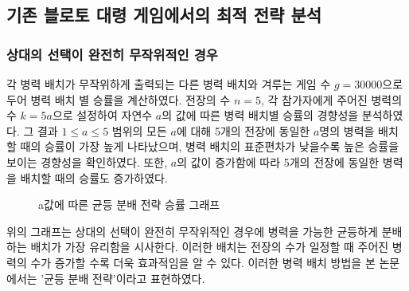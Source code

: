 \subsection{기존 블로토 대령 게임에서의 최적 전략 분석}

\subsubsection{상대의 선택이 완전히 무작위적인 경우}
각 병력 배치가 무작위하게 출력되는 다른 병력 배치와 겨루는 게임 수 $g=30000$으로 두어 병력 배치 별 승률을 계산하였다. 전장의 수 $n=5$, 각 참가자에게 주어진 병력의 수 $k=5a$으로 설정하여 자연수 $a$의 값에 따른 병력 배치별 승률의 경향성을 분석하였다. 그 결과 $1 \leq a \leq 5$ 범위의 모든 $a$에 대해 5개의 전장에 동일한 $a$명의 병력을 배치할 때의 승률이 가장 높게 나타났으며, 병력 배치의 표준편차가 낮을수록 높은 승률을 보이는 경향성을 확인하였다. 또한, $a$의 값이 증가함에 따라 5개의 전장에 동일한 병력을 배치할 때의 승률도 증가하였다.

\begin{figure}[htb!]
    \vspace{1em}
    \centering
    \pgfplotsset{width=0.8\textwidth, height=0.4\textwidth}
    \caption{a값에 따른 균등 분배 전략 승률 그래프}
    \label{fig:enter-label}
\end{figure}



위의 그래프는 상대의 선택이 완전히 무작위적인 경우에 병력을 가능한 균등하게 분배하는 배치가 가장 유리함을 시사한다. 이러한 배치는 전장의 수가 일정할 때 주어진 병력의 수가 증가할 수록 더욱 효과적임을 알 수 있다. 이러한 병력 배치 방법을 본 논문에서는 '균등 분배 전략'이라고 표현하였다.

